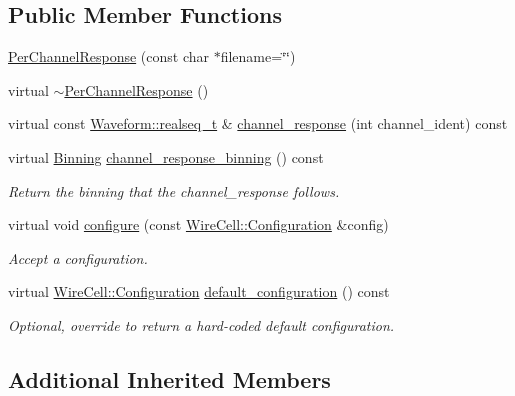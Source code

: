 \subsection*{Public Member Functions}
\begin{DoxyCompactItemize}
\item 
\hyperlink{class_wire_cell_1_1_sig_proc_1_1_per_channel_response_a1d55d1a5a78734c0ad1aaef156fdcdce}{Per\+Channel\+Response} (const char $\ast$filename=\char`\"{}\char`\"{})
\item 
virtual \hyperlink{class_wire_cell_1_1_sig_proc_1_1_per_channel_response_a11a1b84b6618cf38ceca5e729ccc1892}{$\sim$\+Per\+Channel\+Response} ()
\item 
virtual const \hyperlink{namespace_wire_cell_1_1_waveform_a479175e541c8545e87cd8063b74b6956}{Waveform\+::realseq\+\_\+t} \& \hyperlink{class_wire_cell_1_1_sig_proc_1_1_per_channel_response_a9112d33075a8ac432b5e32bed5c65f5b}{channel\+\_\+response} (int channel\+\_\+ident) const
\item 
virtual \hyperlink{class_wire_cell_1_1_binning}{Binning} \hyperlink{class_wire_cell_1_1_sig_proc_1_1_per_channel_response_ab5b6e69f75c2847269b1a0c6c4992709}{channel\+\_\+response\+\_\+binning} () const
\begin{DoxyCompactList}\small\item\em Return the binning that the channel\+\_\+response follows. \end{DoxyCompactList}\item 
virtual void \hyperlink{class_wire_cell_1_1_sig_proc_1_1_per_channel_response_aeab6cfaae5ca5e6697a025d957083047}{configure} (const \hyperlink{namespace_wire_cell_a9f705541fc1d46c608b3d32c182333ee}{Wire\+Cell\+::\+Configuration} \&config)
\begin{DoxyCompactList}\small\item\em Accept a configuration. \end{DoxyCompactList}\item 
virtual \hyperlink{namespace_wire_cell_a9f705541fc1d46c608b3d32c182333ee}{Wire\+Cell\+::\+Configuration} \hyperlink{class_wire_cell_1_1_sig_proc_1_1_per_channel_response_a95e138e2ed5ded34511765b237d8e232}{default\+\_\+configuration} () const
\begin{DoxyCompactList}\small\item\em Optional, override to return a hard-\/coded default configuration. \end{DoxyCompactList}\end{DoxyCompactItemize}
\subsection*{Additional Inherited Members}


